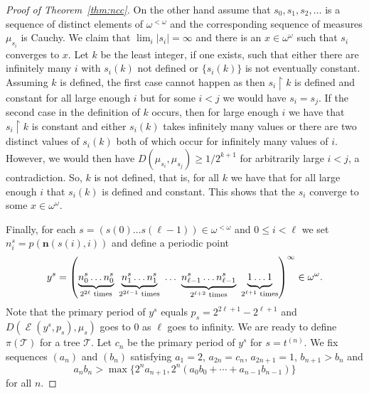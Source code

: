 \documentclass{amsart}
\theoremstyle{definition}
\newcommand{\res}{\restriction}
\newcommand{\ww}{\omega^\omega}
\DeclareMathOperator{\Emp}{\mathcal{E}}%
\begin{document}
\begin{proof}[Proof of Theorem~\ref{thm:ncc}]
On the other hand assume that  $s_0, s_1, s_2,\ldots$ is a sequence of distinct
elements of $\omega^{<\omega}$ and the corresponding sequence of measures
$\mu_{s_i}$ is Cauchy. We claim that $\lim_i |s_i|=\infty$ and there is an $x \in \ww$
such that $s_i$ converges to $x$. Let $k$ be the least integer, if one exists,
such that either there are infinitely many $i$ with $s_i(k)$ not defined or
$\{ s_i(k) \}$ is not eventually constant. Assuming $k$ is defined, the first case cannot
happen as then $s_i\res k$ is defined and constant for all large enough $i$ but
for some $i<j$ we would have $s_i=s_j$. If the second case
in the definition of $k$ occurs, then for large enough $i$ we have
that $s_i\res k$ is constant and either  $s_i(k)$ takes infinitely many values or
there are two distinct values of $s_i(k)$ both of which occur for infinitely
many values of $i$.
However, we would then have
$D(\mu_{s_i}, \mu_{s_j})\geq 1/2^{k+1}$ for arbitrarily large $i<j$,  a contradiction.
So, $k$ is not defined, that is,
for all $k$ we have that for all large enough $i$ that $s_i(k)$ is defined
and constant. This shows that the $s_i$ converge to some $x \in \ww$.





Finally, for each $s=(s(0)\ldots s(\ell-1))\in\omega^{<\omega}$ and $0\le i<\ell$
we set $n^s_i=p(\mathbf{n}(s(i),i))$ and define a periodic point
\[
y^s=
\left(
\underbrace{n^s_0\ldots n^s_0}_{2^{2\ell}\text{ times}}\
\underbrace{n^s_1\ldots n^s_1}_{2^{2\ell-1}\text{ times}}\  \ldots\
\underbrace{n^s_{\ell-1}\ldots n^s_{\ell-1}}_{2^{\ell+2}\text{ times}}\
\underbrace{1\ldots 1\vphantom{n^s_1}}_{2^{\ell+1}\text{ times}}
\right)^\infty\in\omega^\omega.
\]
Note that the primary period of $y^s$ equals $p_s=2^{2\ell+1} - 2^{\ell + 1}$ and
$D(\Emp(y^s, p_s),\mu_s)$ goes to $0$ as $\ell$ goes to infinity.
We are ready to define $\pi(\mathcal{T})$ for a tree $\mathcal{T}$.
Let $c_n$ be the primary period of $y^s$ for $s=t^{(n)}$.
We fix  %
sequences $( a_n)$ and $(b_n)$ satisfying
$a_1=2$, $a_{2n}=c_n$, $a_{2n+1}=1$, $b_{n+1} > b_n$ and
\begin{equation} \label{fqa}
a_nb_n> \max\{ 2^n a_{n+1}, 2^n (a_0 b_0+\cdots+a_{n-1}b_{n-1})\}
\end{equation}
for all $n$.



\end{proof}
\end{document}
